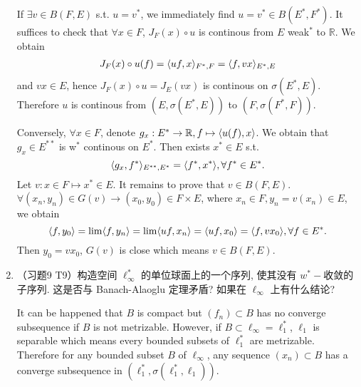 \begin{enumerate}
\begin{answer}
    If $\exists v\in B(F, E)$ s.t. $u = v^*$, we immediately find $u = v^*\in B(E^*, F^*)$. It suffices to check that $\forall x\in F$, $J_F(x)\circ u$ is continous from $E$ weak$^*$ to $\mathbb R$. We obtain  
    \[ \begin{aligned}
        J_F(x)\circ u(f) = \langle uf,x\rangle_{F^*, F}=\langle f,vx\rangle_{E^*, E}
    \end{aligned} \]
    and $vx\in E$, hence $J_F(x)\circ u = J_E(vx)$ is continous on $\sigma(E^*, E)$. Therefore $u$ is continous from $(E, \sigma(E^*, E))$ to $(F, \sigma(F^*, F))$. 

    Conversely, $\forall x \in F$, denote $g_x: E^*\to \mathbb R, f\mapsto \langle u(f),x\rangle$. We obtain that $g_x\in E^{**}$ is w$^*$ continous on $E^*$. Then exists $x^*\in E$ s.t. 
    \[\langle g_x,f^*\rangle_{E^{**}, E^*} = \langle f^*,x^*\rangle, \forall f^*\in E^*. \]
    Let $v: x\in F\mapsto x^*\in E$. 
    It remains to prove that $v\in B(F, E)$. $\forall (x_n, y_n)\in G(v)\to (x_0, y_0)\in F\times E$, where $x_n\in F, y_n = v(x_n)\in E$, we obtain
    \[ \langle f,y_0\rangle = \lim\langle f,y_n\rangle = \lim\langle uf,x_n\rangle = \langle uf,x_0\rangle = \langle f,vx_0\rangle, \forall f\in E^*. \]
    Then $y_0 = vx_0$, $G(v)$ is close which means $v\in B(F, E)$. 
    \end{answer}
  \item （习题9 T9）构造空间 $\ell_{\infty}^{*}$ 的单位球面上的一个序列, 使其没有 $w^{*}-$收敛的子序列. 这是否与 Banach-Alaoglu 定理矛盾? 如果在 $\ell_{\infty}$ 上有什么结论?
    \begin{answer}
      It can be happened that $B$ is compact but $(f_n)\subset B$ has no converge subsequence if $B$ is not metrizable. However, if $B\subset \ell_\infty = \ell_1^*$, $\ell_1$ is separable which means every bounded subsets of $\ell_1^*$ are metrizable. Therefore for any bounded subset $B$ of $\ell_\infty$, any sequence $(x_n)\subset B$ has a converge subsequence in $(\ell_1^*, \sigma(\ell_1^*, \ell_1))$.


\end{answer}
\end{enumerate}
